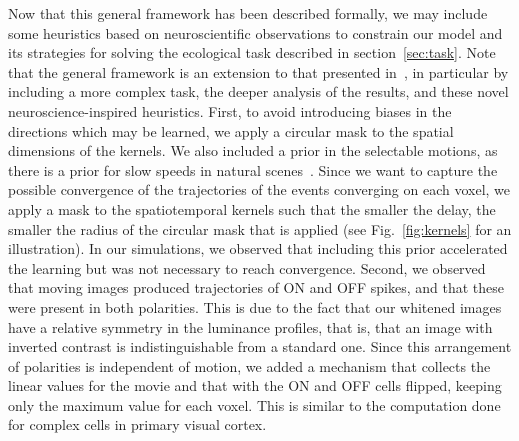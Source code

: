 \documentclass[default]{sn-jnl}%
\theoremstyle{thmstyleone}%
\theoremstyle{thmstyletwo}%
\theoremstyle{thmstylethree}%
\newcommand{\seeFig}[1]{see Fig.~\ref{fig:#1}}%
\begin{document}
Now that this general framework has been described formally, we may include some heuristics based on neuroscientific observations to constrain our model and its strategies for solving the ecological task described in section~\ref{sec:task}. Note that the general framework is an extension to that presented in~\cite{grimaldi_learning_2022}, in particular by including a more complex task, the deeper analysis of the results, and these novel neuroscience-inspired heuristics. First, to avoid introducing biases in the directions which may be learned, we apply a circular mask to the spatial dimensions of the kernels. We also included a prior in the selectable motions, as there is a prior for slow speeds in natural scenes~\citep{vacher_bayesian_2018}. Since we want to capture the possible convergence of the trajectories of the events converging on each voxel, we apply a mask to the spatiotemporal kernels such that the smaller the delay, the smaller the radius of the circular mask that is applied (\seeFig{kernels} for an illustration). In our simulations, we observed that including this prior accelerated the learning but was not necessary to reach convergence. %
Second, we observed that moving images produced trajectories of ON and OFF spikes, and that these were present in both polarities. This is due to the fact that our whitened images have a relative symmetry in the luminance profiles, that is, that an image with inverted contrast is indistinguishable from a standard one. Since this arrangement of polarities is independent of motion, we added a mechanism that collects the linear values for the movie and that with the ON and OFF cells flipped, keeping only the maximum value for each voxel. This is similar to the computation done for complex cells in primary visual cortex.
\end{document}
